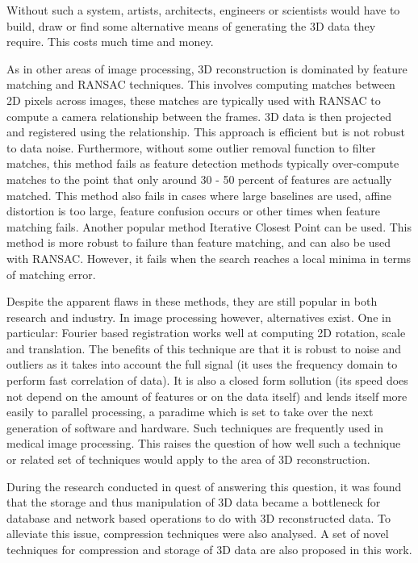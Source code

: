 Without such a system, artists, architects, engineers or scientists would have to build, draw or find some alternative means of generating the 3D data they require. This costs much time and money.

As in other areas of image processing, 3D reconstruction is dominated by feature matching and RANSAC techniques. This involves computing matches between 2D pixels across images, these matches are typically used with RANSAC to compute a camera relationship between the frames. 3D data is then projected and registered using the relationship. This approach is efficient but is not robust to data noise. Furthermore, without some outlier removal function to filter matches, this method fails as feature detection methods typically over-compute matches to the point that only around 30 - 50 percent of features are actually matched. This method also fails in cases where large baselines are used, affine distortion is too large, feature confusion occurs or other times when feature matching fails. Another popular method Iterative Closest Point can be used. This method is more robust to failure than feature matching, and can also be used with RANSAC. However, it fails when the search reaches a local minima in terms of matching error.

Despite the apparent flaws in these methods, they are still popular in both research and industry. In image processing however, alternatives exist. One in particular: Fourier based registration works well at computing 2D rotation, scale and translation. The benefits of this technique are that it is robust to noise and outliers as it takes into account the full signal (it uses the frequency domain to perform fast correlation of data). It is also a closed form sollution (its speed does not depend on the amount of features or on the data itself) and lends itself more easily to parallel processing, a paradime which is set to take over the next generation of software and hardware. Such techniques are frequently used in medical image processing. This raises the question of how well such a technique or related set of techniques would apply to the area of 3D reconstruction.

During the research conducted in quest of answering this question, it was found that the storage and thus manipulation of 3D data became a bottleneck for database and network based operations to do with 3D reconstructed data. To alleviate this issue, compression techniques were also analysed. A set of novel techniques for compression and storage of 3D data are also proposed in this work.  


